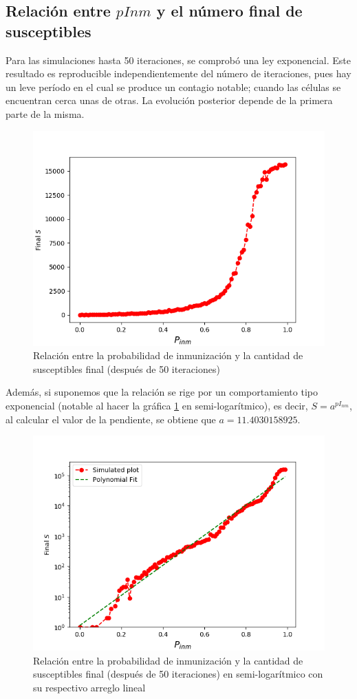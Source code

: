 \documentclass[twoside,twocolumn]{article}
\begin{document}
\subsection{Relación entre $pInm$ y el número final de susceptibles}
Para las simulaciones hasta 50 iteraciones, se comprobó una ley exponencial. Este resultado es reproducible independientemente del número de iteraciones, pues hay un leve período en el cual se produce un contagio notable; cuando las células se encuentran cerca unas de otras. La evolución posterior depende de la primera parte de la misma.
\begin{figure}[H]
\begin{center}
\includegraphics[width=.5\textwidth]{PinmVSs}
\end{center}
\caption{Relación entre la probabilidad de inmunización y la cantidad de susceptibles final (después de 50 iteraciones)}
\label{First}
\end{figure} 
Además, si suponemos que la relación se rige por un comportamiento tipo exponencial (notable al hacer la gráfica \ref{First} en semi-logarítmico), es decir, $S=a^{pI_{nm}}$, al calcular el valor de la pendiente, se obtiene que $a=11.4030158925$.
\begin{figure}[H]
\begin{center}
\includegraphics[width=.5\textwidth]{PinmVSsSemilog.png}
\end{center}
\caption{Relación entre la probabilidad de inmunización y la cantidad de susceptibles final (después de 50 iteraciones) en semi-logarítmico con su respectivo arreglo lineal} 
\end{figure}
\end{document}
